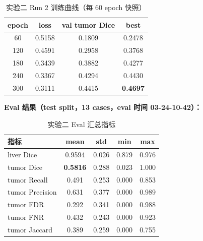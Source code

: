 \documentclass{article}
\begin{document}
	\begin{table}[H]
		\centering
		\caption{实验二 Run 2 训练曲线（每 60 epoch 快照）}
		\begin{tabular}{cccc}
			\hline
			\textbf{epoch} & \textbf{loss} & \textbf{val tumor Dice} & \textbf{best} \\
			\hline
			60  & 0.5158 & 0.1809 & 0.2478 \\
			120 & 0.4591 & 0.2958 & 0.3768 \\
			180 & 0.3439 & 0.3882 & 0.4277 \\
			240 & 0.3367 & 0.4294 & 0.4430 \\
			300 & 0.3111 & 0.4415 & \textbf{0.4697} \\
			\hline
		\end{tabular}
	\end{table}
	
	\noindent\textbf{Eval 结果（test split，13 cases，eval 时间 03-24-10-42）：}
	
	\begin{table}[H]
		\centering
		\caption{实验二 Eval 汇总指标}
		\begin{tabular}{lcccc}
			\hline
			\textbf{指标} & \textbf{mean} & \textbf{std} & \textbf{min} & \textbf{max} \\
			\hline
			liver Dice      & 0.9594 & 0.026 & 0.879 & 0.976 \\
			tumor Dice      & \textbf{0.5816} & 0.288 & 0.023 & 1.000 \\
			tumor Recall    & 0.491  & 0.253 & 0.000 & 0.853 \\
			tumor Precision & 0.631  & 0.377 & 0.000 & 0.989 \\
			tumor FDR       & 0.292  & 0.341 & 0.000 & 0.988 \\
			tumor FNR       & 0.432  & 0.243 & 0.000 & 0.923 \\
			tumor Jaccard   & 0.389  & 0.259 & 0.000 & 0.755 \\
			\hline
		\end{tabular}
	\end{table}
	
\end{document}
